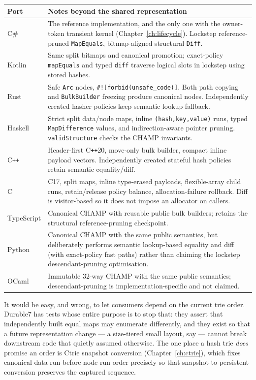 \documentclass[11pt,twoside,openright]{book}
\makeatletter
\newcommand{\code}[1]{\texorpdfstring{\textcolor{d7ink}{\texttt{#1}}}{#1}}
\newenvironment{d7table}[1]
  {\par\vspace{3pt}\small
   \setlength{\LTpre}{4pt}\setlength{\LTpost}{4pt}
   \begin{longtable}{@{}%
     >{\raggedright\arraybackslash}p{#1\textwidth}%
     @{\hspace{10pt}}%
     >{\raggedright\arraybackslash}p{\dimexpr\textwidth-#1\textwidth-10pt\relax}@{}}}
  {\end{longtable}}
\newcommand{\thead}[1]{\sffamily\bfseries\footnotesize\color{d7ink}#1}
\makeatother
\begin{document}
\begin{d7table}{0.15}
\toprule
\thead{Port} & \thead{Notes beyond the shared representation} \\
\midrule
C\#      & The reference implementation, and the only one with the owner-token
transient kernel (Chapter~\ref{ch:lifecycle}). Lockstep reference-pruned
\code{MapEquals}, bitmap-aligned structural \code{Diff}. \\
Kotlin   & Same split bitmaps and canonical promotion; exact-policy
\code{mapEquals} and typed \code{diff} traverse logical slots in lockstep using
stored hashes. \\
Rust     & Safe \code{Arc} nodes, \code{\#![forbid(unsafe\_code)]}. Both path
copying and \code{BulkBuilder} freezing produce canonical nodes. Independently
created hasher policies keep semantic lookup fallback. \\
Haskell  & Strict split data/node maps, inline \code{(hash,key,value)} runs,
typed \code{MapDifference} values, and indirection-aware pointer pruning.
\code{validStructure} checks the CHAMP invariants. \\
C\texttt{++} & Header-first C\texttt{++}20, move-only bulk builder, compact
inline payload vectors. Independently created stateful hash policies retain
semantic equality/diff. \\
C        & C17, split maps, inline type-erased payloads, flexible-array child
runs, retain/release policy balance, allocation-failure rollback. Diff is
visitor-based so it does not impose an allocator on callers. \\
TypeScript & Canonical CHAMP with reusable public bulk builders; retains the
structural reference-pruning checkpoint. \\
Python   & Canonical CHAMP with the same public semantics, but deliberately
performs semantic lookup-based equality and diff (with exact-policy fast paths)
rather than claiming the lockstep descendant-pruning optimisation. \\
OCaml    & Immutable 32-way CHAMP with the same public semantics;
descendant-pruning is implementation-specific and not claimed. \\
\bottomrule
\end{d7table}

\begin{asidebox}
It would be easy, and wrong, to let consumers depend on the current trie order.
Durable7 has tests whose entire purpose is to stop that: they assert that
independently built equal maps may enumerate differently, and they exist so that
a future representation change --- a size-tiered small layout, say --- cannot
break downstream code that quietly assumed otherwise. The one place a hash trie
\emph{does} promise an order is Ctrie snapshot conversion
(Chapter~\ref{ch:ctrie}), which fixes canonical data-run-before-node-run order
precisely so that snapshot-to-persistent conversion preserves the captured
sequence.
\end{asidebox}
\end{document}
